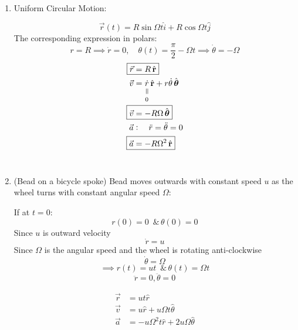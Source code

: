 \documentclass[10pt]{scrartcl}
\begin{document}
\begin{examples}
\begin{enumerate}
  \item Uniform Circular Motion:
  
  \[\vec{r}(t) = R\sin\Omega t\hat{i} + R\cos\Omega t \hat{j}\]
  The corresponding expression in polars:
  \[r = R \implies \dot{r} = 0,\quad \theta(t) = \frac{\pi}{2} - \Omega t \implies \dot{\theta} = -\Omega\]
  \[
\begin{aligned}
  \Aboxed{\vec{r} &= R\hat{r}}\\
  \vec{v} &= \equalto{\dot{r}}{0}\hat{r} + r\dot{\theta}\hat{\theta}\\
  \Aboxed{\vec{v} &= -R\Omega\hat{\theta}}\\
  \vec{a} &: \quad \ddot{r} = \ddot{\theta} = 0\\
  \Aboxed{\vec{a} &= -R\Omega^2\hat{r}}
\end{aligned}
\]~\\

\item (Bead on a bicycle spoke) Bead moves outwards with constant speed $u$ as the wheel turns with constant angular speed $\Omega$:
\begin{center}
\end{center}

If at $t=0$:
\[r(0) = 0 \,\text{ \& }\, \theta(0) = 0\]
Since $u$ is outward velocity
\[\dot{r} = u\]
Since $\Omega$ is the angular speed and the wheel is rotating anti-clockwise
\[\dot{\theta} = \Omega\]
\[\implies r(t) = ut \,\text{ \& }\, \theta(t) = \Omega t	\]
\[\ddot{r} = 0, \ddot{\theta} = 0\]

\[
\begin{aligned}
  \vec{r} &= ut\hat{r}\\
  \vec{v} &= u\hat{r} + u\Omega t\hat{\theta}\\
  \vec{a} &= -u\Omega^2t\hat{r} + 2u\Omega\hat{\theta}
\end{aligned}
\]
\end{enumerate}
\end{examples}
\end{document}
